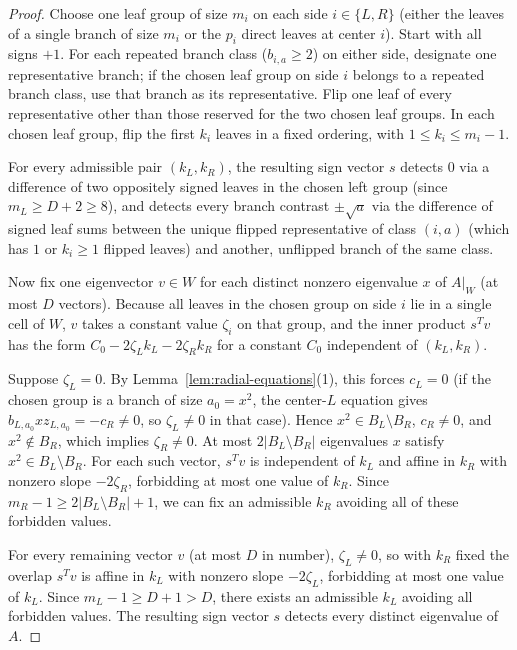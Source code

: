 \documentclass[11pt]{article}
\theoremstyle{plain}
\theoremstyle{remark}
\begin{document}
\begin{proof}
Choose one leaf group of size $m_i$ on each side $i \in \{L,R\}$ (either the
leaves of a single branch of size $m_i$ or the $p_i$ direct leaves at center
$i$). Start with all signs $+1$. For each repeated branch class ($b_{i,a} \geq 2$)
on either side, designate one representative branch; if the chosen leaf group
on side $i$ belongs to a repeated branch class, use that branch as its
representative. Flip one leaf of every representative other than those reserved
for the two chosen leaf groups. In each chosen leaf group, flip the first $k_i$
leaves in a fixed ordering, with $1 \leq k_i \leq m_i - 1$.

For every admissible pair $(k_L, k_R)$, the resulting sign vector $s$ detects
$0$ via a difference of two oppositely signed leaves in the chosen left group
(since $m_L \geq D + 2 \geq 8$), and detects every branch contrast
$\pm\sqrt{a}$ via the difference of signed leaf sums between the unique flipped
representative of class $(i,a)$ (which has $1$ or $k_i \geq 1$ flipped leaves)
and another, unflipped branch of the same class.

Now fix one eigenvector $v \in W$ for each distinct nonzero eigenvalue $x$ of
$A|_W$ (at most $D$ vectors). Because all leaves in the chosen group on side
$i$ lie in a single cell of $W$, $v$ takes a constant value $\zeta_i$ on that
group, and the inner product $s^T v$ has the form
$C_0 - 2\zeta_L k_L - 2\zeta_R k_R$ for a constant $C_0$ independent of
$(k_L, k_R)$.

Suppose $\zeta_L = 0$. By Lemma~\ref{lem:radial-equations}(1), this forces
$c_L = 0$ (if the chosen group is a branch of size $a_0 = x^2$, the center-$L$
equation gives $b_{L,a_0} x z_{L,a_0} = -c_R \neq 0$, so $\zeta_L \neq 0$ in
that case). Hence $x^2 \in B_L \setminus B_R$, $c_R \neq 0$, and
$x^2 \notin B_R$, which implies $\zeta_R \neq 0$. At most
$2|B_L \setminus B_R|$ eigenvalues $x$ satisfy $x^2 \in B_L \setminus B_R$. For
each such vector, $s^T v$ is independent of $k_L$ and affine in $k_R$ with
nonzero slope $-2\zeta_R$, forbidding at most one value of $k_R$. Since
$m_R - 1 \geq 2|B_L \setminus B_R| + 1$, we can fix an admissible $k_R$
avoiding all of these forbidden values.

For every remaining vector $v$ (at most $D$ in number), $\zeta_L \neq 0$, so
with $k_R$ fixed the overlap $s^T v$ is affine in $k_L$ with nonzero slope
$-2\zeta_L$, forbidding at most one value of $k_L$. Since
$m_L - 1 \geq D + 1 > D$, there exists an admissible $k_L$ avoiding all
forbidden values. The resulting sign vector $s$ detects every distinct
eigenvalue of $A$.
\end{proof}
\end{document}
